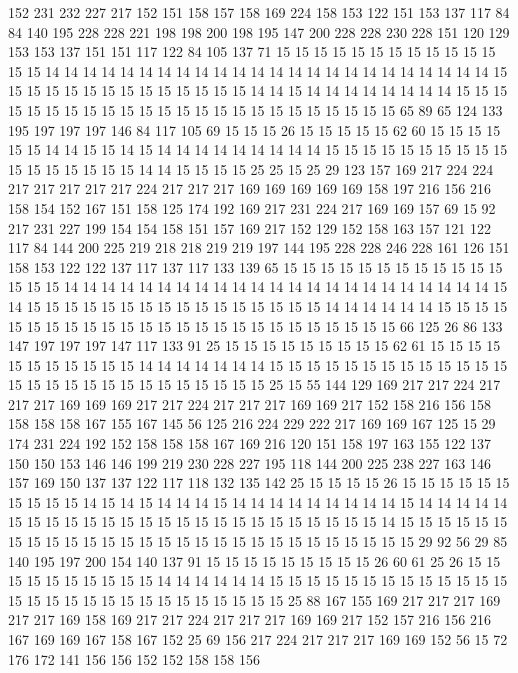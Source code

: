 152 231 232 227 217 152 151 158 157 158 169 224 158 153 122 151 153 137 117 84
84 140 195 228 228 221 198 198 200 198 195 147 200 228 228 230 228 151 120 129
153 153 137 151 151 117 122 84 105 137 71 15 15 15 15 15 15 15 15 15
15 15 15 15 15 14 14 14 14 14 14 14 14 14 14 14 14 14 14 14
14 14 14 14 14 14 14 14 14 15 15 15 15 15 15 15 15 15 15 15
15 15 15 14 14 15 14 14 14 14 14 14 14 14 15 15 15 15 15 15
15 15 15 15 15 15 15 15 15 15 15 15 15 15 15 15 15 15 65 89
65 124 133 195 197 197 197 146 84 117 105 69 15 15 15 26 15 15 15 15
15 62 60 15 15 15 15 15 15 14 14 15 15 14 15 14 14 14 14 14
14 14 14 14 15 15 15 15 15 15 15 15 15 15 15 15 15 15 15 15
15 14 14 15 15 15 15 25 25 15 25 29 123 157 169 217 224 224 217 217
217 217 217 224 217 217 217 169 169 169 169 169 158 197 216 156 216 158 154 152
167 151 158 125 174 192 169 217 231 224 217 169 169 157 69 15 92 217 231 227
199 154 154 158 151 157 169 217 152 129 152 158 163 157 121 122 117 84 144 200
225 219 218 218 219 219 197 144 195 228 228 246 228 161 126 151 158 153 122 122
137 117 137 117 133 139 65 15 15 15 15 15 15 15 15 15 15 15 15 15
15 15 14 14 14 14 14 14 14 14 14 14 14 14 14 14 14 14 14 14
14 14 14 14 14 15 14 15 15 15 15 15 15 15 15 15 15 15 15 15
15 15 15 14 14 14 14 14 14 15 15 15 15 15 15 15 15 15 15 15
15 15 15 15 15 15 15 15 15 15 15 15 15 15 66 125 26 86 133 147
197 197 197 147 117 133 91 25 15 15 15 15 15 15 15 15 15 62 61 15
15 15 15 15 15 15 15 15 15 15 14 14 14 14 14 14 14 15 15 15
15 15 15 15 15 15 15 15 15 15 15 15 15 15 15 15 15 15 15 15
15 15 15 15 25 15 55 144 129 169 217 217 224 217 217 217 169 169 169 217
217 224 217 217 217 169 169 217 152 158 216 156 158 158 158 158 167 155 167 145
56 125 216 224 229 222 217 169 169 167 125 15 29 174 231 224 192 152 158 158
158 167 169 216 120 151 158 197 163 155 122 137 150 150 153 146 146 199 219 230
228 227 195 118 144 200 225 238 227 163 146 157 169 150 137 137 122 117 118 132
135 142 25 15 15 15 15 26 15 15 15 15 15 15 15 15 15 15 14 15
14 15 14 14 14 15 14 14 14 14 14 14 14 14 14 15 14 14 14 14
14 15 15 15 15 15 15 15 15 15 15 15 15 15 15 15 15 15 15 15
15 14 15 15 15 15 15 15 15 15 15 15 15 15 15 15 15 15 15 15
15 15 15 15 15 15 15 15 15 15 29 92 56 29 85 140 195 197 200 154
140 137 91 15 15 15 15 15 15 15 15 15 26 60 61 25 26 15 15 15
15 15 15 15 15 15 15 14 14 14 14 14 14 15 15 15 15 15 15 15
15 15 15 15 15 15 15 15 15 15 15 15 15 15 15 15 15 15 15 15
15 25 88 167 155 169 217 217 217 169 217 217 169 158 169 217 217 224 217 217
217 169 169 217 152 157 216 156 216 167 169 169 167 158 167 152 25 69 156 217
224 217 217 217 169 169 152 56 15 72 176 172 141 156 156 152 152 158 158 156
